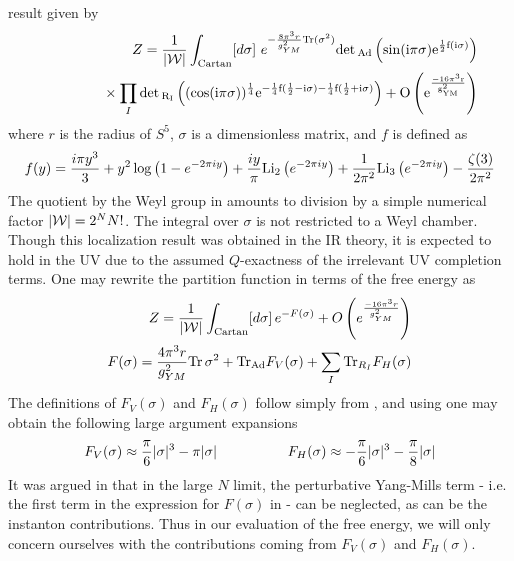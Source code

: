 \documentclass[12pt]{article}
\begin{document}
result given by
\begin{eqnarray}
Z = {1 \over |{\cal W}|} \int_{\mathrm{Cartan}}[d\sigma] \,\,e^{- {8 \pi^3 r \over g_{YM}^2} \mathrm{Tr}(\sigma^2)}\rm det \,_{\mathrm{Ad}}\left(\sin(i \pi \sigma) e^{{1\over 2} f(i \sigma)} \right)
\nonumber\\
\vphantom{.}\hspace{0.6 in} \times \prod_I \rm det \,_{R_I}\left((\cos(i \pi \sigma))^{1 \over 4} e^{-{1 \over 4} f({1\over 2} - i \sigma) - {1 \over 4} f({1\over 2} + i \sigma)} \right) + O\left(e^{- 16 \pi^3 r \over g_{YM}^2}\right)
\end{eqnarray}
where $r$ is the radius of $S^5$, $\sigma$ is a dimensionless matrix, and $f$ is defined as 
\begin{eqnarray}
f(y) = {i \pi y^3 \over 3} + y^2 \log\left(1-e^{-2 \pi i y} \right) + {i y \over \pi} \mathrm{Li}_2\left(e^{-2 \pi i y} \right) + {1 \over 2 \pi^2} \mathrm{Li}_3\left(e^{-2 \pi i y }\right) - {\zeta(3) \over 2 \pi^2}
\end{eqnarray}
The quotient by the Weyl group in  amounts to division by a simple numerical factor $|{\cal W}| = 2^N N!$. The integral over $\sigma$ is not restricted to a Weyl chamber. Though this localization result was obtained in the IR theory, it is expected to hold in the UV due to the assumed $Q$-exactness of the irrelevant UV completion terms. 
 One may rewrite the partition function in terms of the free energy as 
\begin{eqnarray}
Z = {1 \over |{\cal W}|} \int_{\mathrm{Cartan}}[d\sigma] \,e^{-F({\sigma})}+ O\left(e^{- 16 \pi^3 r \over g_{YM}^2}\right)
\nonumber\\
F(\sigma) = {4 \pi^3 r \over g_{YM}^2} \mathrm{Tr}\,\sigma^2 + \mathrm{Tr}_{\mathrm{Ad}} F_V(\sigma) + \sum_I \mathrm{Tr}_{R_I} F_H(\sigma)
\end{eqnarray}
The definitions of $F_V(\sigma)$ and $F_H(\sigma)$ follow simply from , and using  one may obtain the following large argument expansions
\begin{eqnarray}
F_V(\sigma) \approx {\pi \over 6} |\sigma|^3 - \pi |\sigma| \hspace{0.7 in} F_H(\sigma) \approx - {\pi \over 6} |\sigma|^3 - {\pi \over 8} | \sigma|
\end{eqnarray}
It was argued in  that in the large $N$ limit, the perturbative Yang-Mills term - i.e. the first term in the expression for $F(\sigma)$ in  -  can be neglected, as can be the instanton contributions. Thus in our evaluation of the free energy, we will only concern ourselves with the contributions coming from $F_V(\sigma)$ and $F_H(\sigma)$. 
\end{document}

